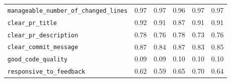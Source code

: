 \begin{table}[!htbp]
\begin{tabular}{lccccc}
\texttt{manageable\_number\_of\_changed\_lines} & 0.97 & 0.97 & 0.96 & 0.97 & 0.97 \\
\texttt{clear\_pr\_title} & 0.92 & 0.91 & 0.87 & 0.91 & 0.91 \\
\texttt{clear\_pr\_description} & 0.78 & 0.76 & 0.78 & 0.73 & 0.76 \\
\texttt{clear\_commit\_message} & 0.87 & 0.84 & 0.87 & 0.83 & 0.85 \\
\texttt{good\_code\_quality} & 0.09 & 0.09 & 0.10 & 0.10 & 0.10 \\
\texttt{responsive\_to\_feedback} & 0.62 & 0.59 & 0.65 & 0.70 & 0.64 \\
\bottomrule
\end{tabular}
\end{table}
